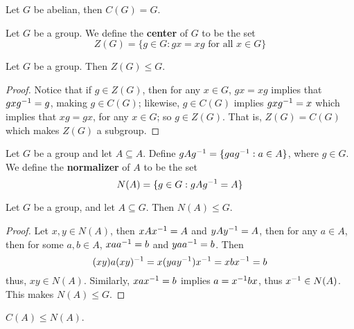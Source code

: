 \begin{example}\label{example_2.3}
  Let $G$ be abelian, then  $C(G)=G$.
\end{example}

\begin{definition}
  Let $G$ be a group. We define the  \textbf{center} of $G$ to be the set
  \begin{equation*}
    Z(G)=\{g \in G : gx=xg \text{ for all } x \in G\}
  \end{equation*}
\end{definition}

\begin{lemma}\label{lemma_2.2.2}
  Let  $G$ be a group. Then  $Z(G) \leq G$.
\end{lemma}
\begin{proof}
  Notice that if $g \in Z(G)$, then for any $x \in G$, $gx=xg$ implies that
  $gxg^{-1}=g$, making $g \in C(G)$; likewise, $g \in C(G)$ implies
  $gxg^{-1}=x$ which implies that $xg=gx$, for any  $x \in G$; so  $g \in
  Z(G)$. That is, $Z(G)=C(G)$ which makes $Z(G)$ a subgroup.
\end{proof}

\begin{definition}
  Let $G$ be a group and let  $A \subseteq A$. Define $gAg^{-1}=\{gag^{-1} :
  a \in A\}$, where $g \in G$. We define the \textbf{normalizer} of $A$ to be
  the set
  \begin{equation*}
    N(A)=\{g \in G : gAg^{-1}=A\}
  \end{equation*}
\end{definition}

\begin{lemma}\label{lemma_2.2.3}
  Let $G$ be a group, and let  $A \subseteq G$. Then  $N(A) \leq G$.
\end{lemma}
\begin{proof}
  Let $x,y \in N(A)$, then $xAx^{-1}=A$ and $yAy^{-1}=A$, then for any  $a
  \in A$, then for some $a,b \in A$, $xaa^{-1}=b$ and $yaa^{-1}=b$. Then
  \begin{equation*}
    (xy)a(xy)^{-1}=x(yay^{-1})x^{-1}=xbx^{-1}=b
  \end{equation*}
  thus, $xy \in N(A)$. Similarly, $xax^{-1}=b$ implies $a=x^{-1}bx$,
  thus $x^{-1} \in N(A)$. This makes $N(A) \leq G$.
\end{proof}
\begin{corollary}
  $C(A) \leq N(A)$.
\end{corollary}

